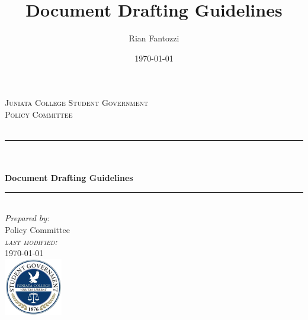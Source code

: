 \documentclass[12pt, letterpaper]{report}
\title{Document Drafting Guidelines}
\author{Rian Fantozzi}
\date{\today}
\newcommand{\HRule}{\rule{\linewidth}{0.5mm}}
\begin{document}
		\begin{titlepage}
		\center 
		\textsc{\LARGE Juniata College Student Government}\\[1cm] %
		\textsc{\Large Policy Committee}\\[0.5cm] %
		\textsc{\large \textit{}}\\[0.5cm] %
		\HRule \\[0.4cm]
		{\Huge \bfseries\\ Document Drafting Guidelines }\\[0.4cm] %
		\HRule \\[1.5cm]
		
		
		
		\Large \emph{Prepared by:}\\
        {Policy Committee}\\[2.5cm] %

		{\large \textit{\textsc{last modified:\\}}\today}\\[1cm] %
		
		
		\includegraphics{studgov-small.png}\\[0.5cm] %
		
		
		\vfill %
		
	\end{titlepage}
\end{document}
